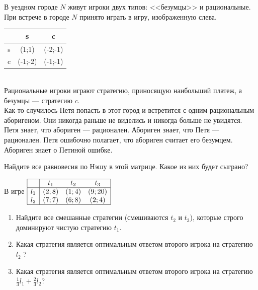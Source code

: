 \begin{problem} 

В уездном городе  $N$  живут игроки двух типов: <<безумцы>> и рациональные. При встрече в городе  $N$  принято играть в игру, изображенную слева.\\
\begin{tabular}{|c|c|c|}
			\hline
			& s & c \\
			\hline
			s & (1;1) & (-2;-1) \\
			c & (-1;-2) & (-1;-1) \\
			\hline
\end{tabular} \\
Рациональные игроки играют стратегию, приносящую наибольший платеж, а безумцы --- стратегию  $c$.\\
Как-то случилось Петя попасть в этот город и встретится с одним рациональным аборигеном. Они никогда раньше не виделись и никогда больше не увидятся. Петя знает, что абориген --- рационален. Абориген знает, что Петя --- рационален. Петя ошибочно полагает, что абориген считает его безумцем. Абориген знает о Петиной ошибке.

Найдите все равновесия по Нэшу в этой матрице. Какое из них будет сыграно?



\begin{sol}

\end{sol}
\end{problem}





\begin{problem}
В игре
$\begin{array}{|c|ccc|}
\hline
{} & {t_{1} } & {t_{2} } & {t_{3} } \\
\hline
{l_{1} } & {\left(2;8\right)} & {\left(1;4\right)} & {\left(9;20\right)} \\ {l_{2} } & {\left(7;7\right)} & {\left(6;8\right)} & {\left(2;4\right)} \\  \hline
\end{array}$
\begin{enumerate}
\item Найдите все смешанные стратегии (смешиваются  $t_{2}$  и  $t_{3}$), которые строго доминируют чистую стратегию  $t_{1}$.\par
\item Какая стратегия является оптимальным ответом второго игрока на стратегию  $l_{2} $ ?\par
\item  Какая стратегия является оптимальным ответом второго игрока на стратегию  $\frac{1}{3} l_{1} +\frac{2}{3} l_{2}$?\par
\end{enumerate}


\begin{sol}

\end{sol}
\end{problem}





